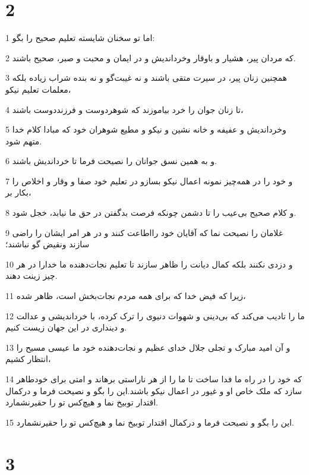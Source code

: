 \chapter{2}

\par 1 اما تو سخنان شایسته تعلیم صحیح را بگو:
\par 2 که مردان پیر، هشیار و باوقار وخرداندیش و در ایمان و محبت و صبر، صحیح باشند.
\par 3 همچنین زنان پیر، در سیرت متقی باشند و نه غیبت‌گو و نه بنده شراب زیاده بلکه معلمات تعلیم نیکو،
\par 4 تا زنان جوان را خرد بیاموزند که شوهردوست و فرزنددوست باشند،
\par 5 وخرداندیش و عفیفه و خانه نشین و نیکو و مطیع شوهران خود که مبادا کلام خدا متهم شود.
\par 6 و به همین نسق جوانان را نصیحت فرما تا خرداندیش باشند.
\par 7 و خود را در همه‌چیز نمونه اعمال نیکو بسازو در تعلیم خود صفا و وقار و اخلاص را بکار بر،
\par 8 و کلام صحیح بی‌عیب را تا دشمن چونکه فرصت بد‌گفتن در حق ما نیابد، خجل شود.
\par 9 غلامان را نصیحت نما که آقایان خود رااطاعت کنند و در هر امر ایشان را راضی سازند ونقیض گو نباشند؛
\par 10 و دزدی نکنند بلکه کمال دیانت را ظاهر سازند تا تعلیم نجات‌دهنده ما خدارا در هر چیز زینت دهند.
\par 11 زیرا که فیض خدا که برای همه مردم نجات‌بخش است، ظاهر شده،
\par 12 ما را تادیب می‌کند که بی‌دینی و شهوات دنیوی را ترک کرده، با خرداندیشی و عدالت و دینداری در این جهان زیست کنیم.
\par 13 و آن امید مبارک و تجلی جلال خدای عظیم و نجات‌دهنده خود ما عیسی مسیح را انتظار کشیم،
\par 14 که خود را در راه ما فدا ساخت تا ما را از هر ناراستی برهاند و امتی برای خودطاهر سازد که ملک خاص او و غیور در اعمال نیکو باشند.این را بگو و نصیحت فرما و درکمال اقتدار توبیخ نما و هیچ‌کس تو را حقیرنشمارد.
\par 15 این را بگو و نصیحت فرما و درکمال اقتدار توبیخ نما و هیچ‌کس تو را حقیرنشمارد.

\chapter{3}

